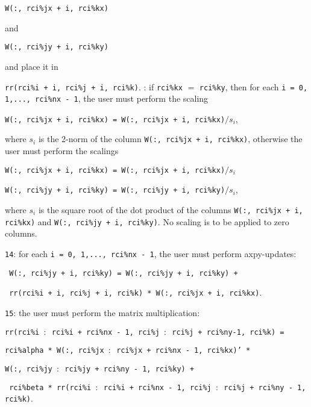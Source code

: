 \begin{description}
\begin{description}
\hspace{8mm}
{\tt W(:, rci\%jx + i, rci\%kx)} 

and

\hspace{8mm}
{\tt W(:, rci\%jy + i, rci\%ky)}

and place it in 

\hspace{8mm}
{\tt rr(rci\%i + i, rci\%j + i, rci\%k)}.
%
: 
if {\tt rci\%kx} $=$ {\tt rci\%ky}, then
for each
{\tt i = 0, 1,..., rci\%nx - 1}, 
the user must perform the scaling

\hspace{8mm}
{\tt W(:, rci\%jx + i, rci\%kx) = W(:, rci\%jx + i, rci\%kx)$/s_i$},

where $s_i$ is the 2-norm of the column 
{\tt W(:, rci\%jx + i, rci\%kx)},
otherwise the user must perform the scalings

\hspace{8mm}
{\tt W(:, rci\%jx + i, rci\%kx) = W(:, rci\%jx + i, rci\%kx)$/s_i$}

\hspace{8mm}
{\tt W(:, rci\%jy + i, rci\%ky) = W(:, rci\%jy + i, rci\%ky)$/s_i$},

where $s_i$ is the square root of the dot product of 
the columns 
{\tt W(:, rci\%jx + i, rci\%kx)} and
{\tt W(:, rci\%jy + i, rci\%ky)}.
No scaling is to be applied to zero columns.
%
\item
{\tt 14}: 
for each {\tt i = 0, 1,..., rci\%nx - 1}, 
the user must perform axpy-updates:

\hspace{8mm}
{\tt 
W(:, rci\%jy + i, rci\%ky) = 
W(:, rci\%jy + i, rci\%ky) + 
}

\hspace{12mm}
{\tt
rr(rci\%i + i, rci\%j + i, rci\%k) * W(:, rci\%jx + i, rci\%kx)}.
%
\item
{\tt 15}: the user must perform the matrix multiplication:

\hspace{8mm}
{\tt rr(rci\%i $:$ rci\%i + rci\%nx - 1, rci\%j $:$ rci\%j + rci\%ny-1, rci\%k) =}

\hspace{12mm}
{\tt rci\%alpha *
W(:, rci\%jx $:$ rci\%jx + rci\%nx - 1, rci\%kx)' *}

\hspace{16mm}
{\tt W(:, rci\%jy $:$ rci\%jy + rci\%ny - 1, rci\%ky) +}

\hspace{12mm}
{\tt 
rci\%beta *
rr(rci\%i $:$ rci\%i + rci\%nx - 1, rci\%j $:$ rci\%j + rci\%ny - 1, rci\%k)}.


\end{description}
\end{description}
